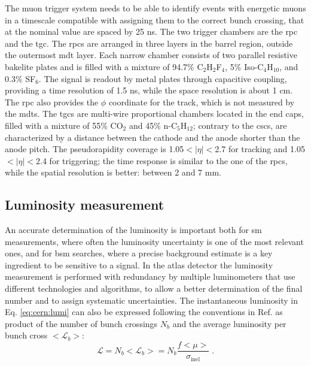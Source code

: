 The muon trigger system needs to be able to identify events with energetic muons in a timescale compatible with assigning them to the correct bunch crossing, that at the nominal value are spaced by 25 ns. The two trigger chambers are the \gls{rpc} and the \gls{tgc}. The \glspl{rpc} are arranged in three layers in the barrel region, outside the outermost \gls{mdt} layer. Each narrow chamber consists of two parallel resistive bakelite plates and is filled with a mixture of 94.7\% C$_2$H$_2$F$_4$, 5\% Iso-C$_4$H$_{10}$, and 0.3\% SF$_6$. The signal is readout by metal plates through capacitive coupling, providing a time resolution of 1.5 ns, while the space resolution is about 1 cm. The \gls{rpc} also provides the $\phi$ coordinate for the track, which is not measured by the \glspl{mdt}. The \glspl{tgc} are multi-wire proportional chambers located in the end caps, filled with a mixture of 55\% CO$_2$ and 45\% n-C$_5$H$_{12}$; contrary to the \glspl{csc}, are characterized by a distance between the cathode and the anode shorter than the anode pitch. The pseudorapidity coverage is 1.05$<|\eta|<$2.7 for tracking and 1.05$<|\eta|<$2.4 for triggering; the time response is similar to the one of the \glspl{rpc}, while the spatial resolution is better: between 2 and 7 mm. 

\subsection{Luminosity measurement}
\label{sec:lumimeas}

An accurate determination of the luminosity is important both for \gls{sm} measurements, where often the luminosity uncertainty is one of the most relevant ones, and for \gls{bsm} searches, where a precise background estimate is a key ingredient to be sensitive to a signal. In the \gls{atlas} detector the luminosity measurement is performed with redundancy by multiple luminometers that use different technologies and algorithms, to allow a better determination of the final number and to assign systematic uncertainties. The instantaneous luminosity in Eq. \ref{eq:cern:lumi} can also be expressed following the conventions in Ref. \cite{Aaboud:2016hhf} as product of the number of bunch crossings $N_b$ and the average luminosity per bunch cross $<\mathcal{L}_b>$:
\begin{equation}
\mathcal{L} = N_b <\mathcal{L}_b> = N_b \frac{f <\mu>}{\sigma_{\mathrm{inel}} } \; .
\label{eq:atlas:lumi}
\end{equation}

